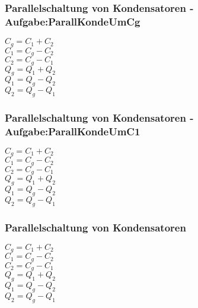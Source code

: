 \subsubsection{Parallelschaltung von Kondensatoren - Aufgabe:ParallKondeUmCg} 
\begin{minipage}{0.45\textwidth} 
$ C_{g}  = C_{1}  + C_{2} $\\ 
$ C_{1}  = C_{g}  - C_{2} $\\ 
$ C_{2}  = C_{g}  - C_{1} $\\ 
$ Q_{g}  = Q_{1}  + Q_{2} $\\ 
$ Q_{1}  = Q_{g}  - Q_{2} $\\ 
$ Q_{2}  = Q_{g}  - Q_{1} $\\ 
\end{minipage} 
\begin{minipage}{0.45\textwidth} 
 
\end{minipage} 
\subsubsection{Parallelschaltung von Kondensatoren - Aufgabe:ParallKondeUmC1} 
\begin{minipage}{0.45\textwidth} 
$ C_{g}  = C_{1}  + C_{2} $\\ 
$ C_{1}  = C_{g}  - C_{2} $\\ 
$ C_{2}  = C_{g}  - C_{1} $\\ 
$ Q_{g}  = Q_{1}  + Q_{2} $\\ 
$ Q_{1}  = Q_{g}  - Q_{2} $\\ 
$ Q_{2}  = Q_{g}  - Q_{1} $\\ 
\end{minipage} 
\begin{minipage}{0.45\textwidth} 
 
\end{minipage} 
\subsubsection{Parallelschaltung von Kondensatoren} 
\begin{minipage}{0.45\textwidth} 
$ C_{g}  = C_{1}  + C_{2} $\\ 
$ C_{1}  = C_{g}  - C_{2} $\\ 
$ C_{2}  = C_{g}  - C_{1} $\\ 
$ Q_{g}  = Q_{1}  + Q_{2} $\\ 
$ Q_{1}  = Q_{g}  - Q_{2} $\\ 
$ Q_{2}  = Q_{g}  - Q_{1} $\\ 
\end{minipage} 
\begin{minipage}{0.45\textwidth} 
 
\end{minipage} 
